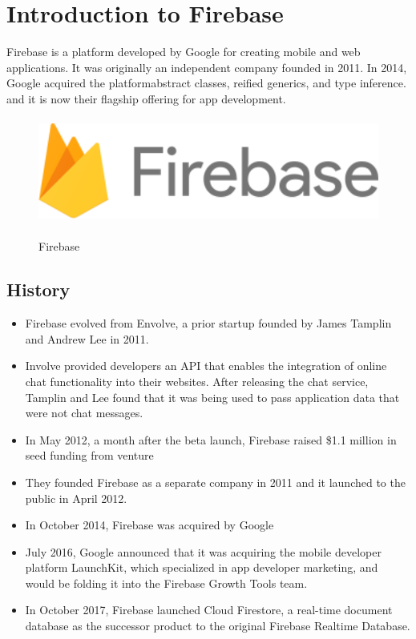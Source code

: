 \chapter{Introduction to Firebase}
Firebase is a platform developed by Google for creating mobile and web applications. It was originally an independent company founded in 2011. In 2014, Google acquired the platformabstract classes, reified generics, and type inference.\\ 
and it is now their flagship offering for app development.\\

\begin{figure}[h]
  \begin{center}
  \includegraphics[height=35mm]{Images & Logos/CH_03_firebase.png}\\
  \end{center}
  \caption{Firebase}
\end{figure}  

\section{History}
\begin{itemize}
  \item Firebase evolved from Envolve, a prior startup founded by James Tamplin and Andrew Lee in 2011.
  \item Involve provided developers an API that enables the integration of online chat functionality into their websites. After releasing the chat service, Tamplin and Lee found that it was being used to pass application data that were not chat messages.
  \item In May 2012, a month after the beta launch, Firebase raised \$1.1 million in seed funding from venture
  \item They founded Firebase as a separate company in 2011 and it launched to the public in April 2012.
  \item In October 2014, Firebase was acquired by Google
  \item July 2016, Google announced that it was acquiring the mobile developer platform LaunchKit, which specialized in app developer marketing, and would be folding it into the Firebase Growth Tools team.
  \item In October 2017, Firebase launched Cloud Firestore, a real-time document database as the successor product to the original Firebase Realtime Database.
\end{itemize}

